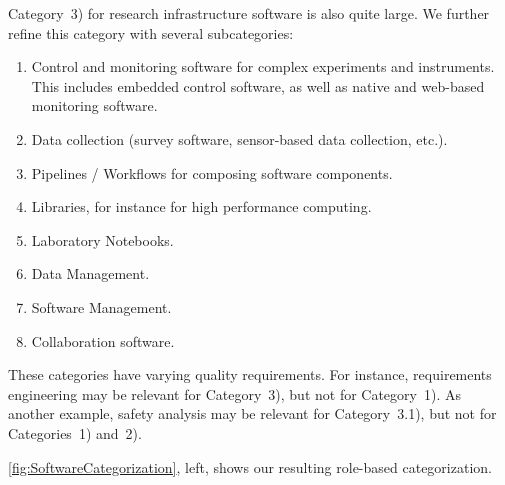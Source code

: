 \documentclass{IEEEcsmag}
\begin{document}
Category~3) for research infrastructure software is also quite large. We further refine this category with several subcategories:
\begin{enumerate}[label=3.\arabic*)]
\itemindent=1em
	\item Control and monitoring software for complex experiments and instruments. This includes embedded control software, as well as native and web-based monitoring software.
	\item Data collection (survey software, sensor-based data collection, etc.).
	\item Pipelines / Workflows for composing software components.
	\item Libraries, for instance for high performance computing.
	\item Laboratory Notebooks.
	\item Data Management.
	\item Software Management.
	\item Collaboration software.
\end{enumerate}
These categories have varying quality requirements. 
For instance, requirements engineering may be relevant for Category~3), but not for Category~1).
As another example, safety analysis may be relevant for Category~3.1), but not for Categories~1) and~2).

\autoref{fig:SoftwareCategorization}, left, shows our resulting role-based categorization.
\end{document}
